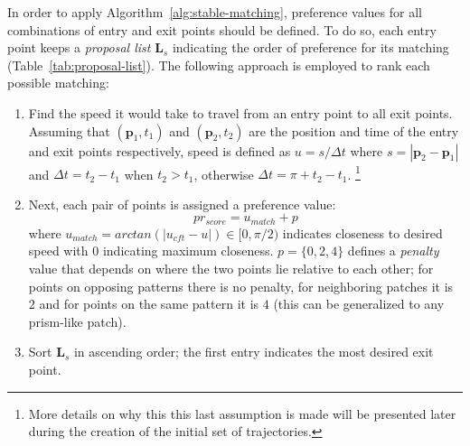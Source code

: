 In order to apply Algorithm~\ref{alg:stable-matching}, preference values for all combinations of entry and exit points should be defined.
To do so, each entry point keeps a \emph{proposal list} $\mathbf{L}_s$ indicating the order of preference for its matching (Table~\ref{tab:proposal-list}).
The following approach is employed to rank each possible matching:
\begin{enumerate}
  \item Find the speed it would take to travel from an entry point to all exit points.
  Assuming that $(\mathbf{p}_1, t_1)$ and $(\mathbf{p}_2,t_2)$ are the position and time of the entry and exit points respectively, speed is defined as $u = s / {\Delta}t$ where $s=|\mathbf{p}_2-\mathbf{p}_1|$ and ${\Delta}t = t_2 - t_1$ when $t_2 > t_1$, otherwise ${\Delta}t=\pi + t_2 - t_1$.
  \footnote{More details on why this this last assumption is made will be presented later during the creation of the initial set of trajectories.}
  \item %
  Next, each pair of points is assigned a preference value:
  \begin{equation}
  	pr_{score} = u_{match} + p
  	\label{eqn:objective_function}
  \end{equation}
  where
  		$u_{match} = arctan(|u_{cft} - u|) \in [0, \pi / 2)$ indicates closeness to desired speed with $0$ indicating maximum closeness. 
    	$p = \{0, 2, 4\}$ defines a \emph{penalty} value that depends on where the two points lie relative to each other; for points on opposing patterns there is no penalty, for neighboring patches it is $2$ and for points on the same pattern it is $4$ (this can be generalized to any prism-like patch). 

  \item Sort $\mathbf{L}_s$ in ascending order; the first entry indicates the most desired exit point.
\end{enumerate}
 

